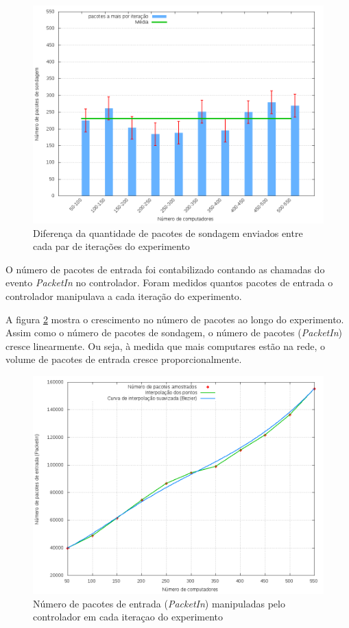 \begin{figure}[!htb]
    \centering
    \label{fig:npings-stats}
    \includegraphics[width=\linewidth]{img/npings-stats}
    \caption{Diferença da quantidade de pacotes de sondagem enviados entre 
    cada par de iterações do experimento}
\end{figure}

O número de pacotes de entrada foi contabilizado contando as chamadas do 
evento \emph{PacketIn} no controlador.
Foram medidos quantos pacotes de entrada o controlador manipulava a cada 
iteração do experimento.

A figura \ref{fig:packets-in} mostra o crescimento no número de pacotes ao 
longo do experimento. 
Assim como o número de pacotes de sondagem, o número de pacotes 
(\emph{PacketIn}) cresce linearmente.
Ou seja, à medida que mais computares estão na rede, o volume de pacotes de 
entrada cresce proporcionalmente.

\begin{figure}[!htb]
    \centering
    \label{fig:packets-in}
    \includegraphics[width=\linewidth]{img/packets-in}
    \caption{Número de pacotes de entrada (\emph{PacketIn}) manipuladas pelo
    controlador em cada iteraçao do experimento}
\end{figure}


